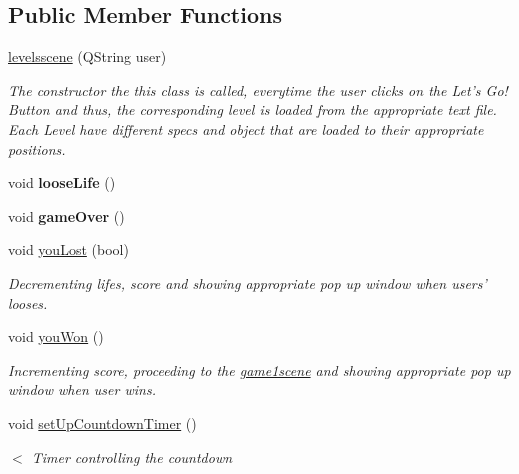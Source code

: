 \subsection*{Public Member Functions}
\begin{DoxyCompactItemize}
\item 
\hyperlink{classlevelsscene_ac88ccf0616d65eeea4793d9b7f185fe8}{levelsscene} (Q\-String user)
\begin{DoxyCompactList}\small\item\em The constructor the this class is called, everytime the user clicks on the Let's Go! Button and thus, the corresponding level is loaded from the appropriate text file. Each Level have different specs and object that are loaded to their appropriate positions. \end{DoxyCompactList}\item 
\hypertarget{classlevelsscene_aad6a31116f8cf58b8f2240be36843657}{void {\bfseries loose\-Life} ()}\label{classlevelsscene_aad6a31116f8cf58b8f2240be36843657}

\item 
\hypertarget{classlevelsscene_a238d7f1f1542f943fb7851535a83cf52}{void {\bfseries game\-Over} ()}\label{classlevelsscene_a238d7f1f1542f943fb7851535a83cf52}

\item 
void \hyperlink{classlevelsscene_a4b0a1ba6c491db4488cd28a08c18591d}{you\-Lost} (bool)
\begin{DoxyCompactList}\small\item\em Decrementing lifes, score and showing appropriate pop up window when users' looses. \end{DoxyCompactList}\item 
void \hyperlink{classlevelsscene_ab7752c641256cdc4389ad166b421838a}{you\-Won} ()
\begin{DoxyCompactList}\small\item\em Incrementing score, proceeding to the \hyperlink{classgame1scene}{game1scene} and showing appropriate pop up window when user wins. \end{DoxyCompactList}\item 
void \hyperlink{classlevelsscene_ae380900a9cf4e534bd61946861fd350e}{set\-Up\-Countdown\-Timer} ()
\begin{DoxyCompactList}\small\item\em $<$ Timer controlling the countdown \end{DoxyCompactList}\end{DoxyCompactItemize}
